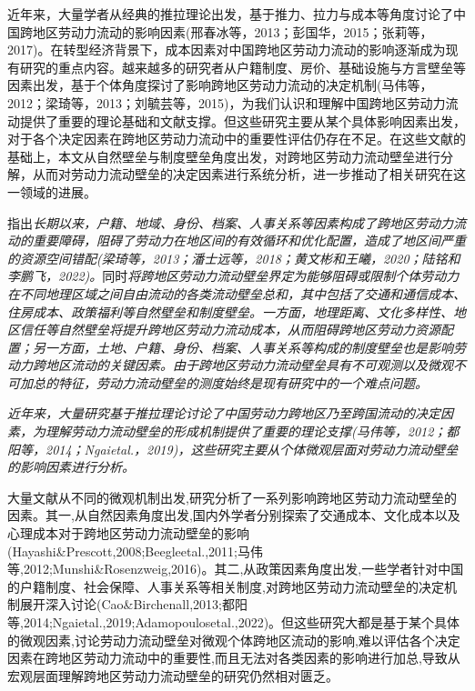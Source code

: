 \documentclass[a4paper,12pt,oneside]{book} %
\begin{document}
近年来，大量学者从经典的推拉理论出发，基于推力、拉力与成本等角度讨论了中国跨地区劳动力流动的影响因素(邢春冰等，2013；彭国华，2015；张莉等，2017)。在转型经济背景下，成本因素对中国跨地区劳动力流动的影响逐渐成为现有研究的重点内容。越来越多的研究者从户籍制度、房价、基础设施与方言壁垒等因素出发，基于个体角度探讨了影响跨地区劳动力流动的决定机制(马伟等，2012；梁琦等，2013；刘毓芸等，2015)，为我们认识和理解中国跨地区劳动力流动提供了重要的理论基础和文献支撑。但这些研究主要从某个具体影响因素出发，对于各个决定因素在跨地区劳动力流动中的重要性评估仍存在不足。在这些文献的基础上，本文从自然壁垒与制度壁垒角度出发，对跨地区劳动力流动壁垒进行分解，从而对劳动力流动壁垒的决定因素进行系统分析，进一步推动了相关研究在这一领域的进展。

\cite{JiangWeiZhongGuoKuaDiQuLaoDongLiLiuDongBiLeiCeDuFangFaYanJinQuShiYuJueDingYinSu2024}指出\textit{长期以来，户籍、地域、身份、档案、人事关系等因素构成了跨地区劳动力流动的重要障碍，阻碍了劳动力在地区间的有效循环和优化配置，造成了地区间严重的资源空间错配(梁琦等，2013；潘士远等，2018；黄文彬和王曦，2020；陆铭和李鹏飞，2022)。}同时\textit{将跨地区劳动力流动壁垒界定为能够阻碍或限制个体劳动力在不同地理区域之间自由流动的各类流动壁垒总和，其中包括了交通和通信成本、住房成本、政策福利等自然壁垒和制度壁垒。一方面，地理距离、文化多样性、地区信任等自然壁垒将提升跨地区劳动力流动成本，从而阻碍跨地区劳动力资源配置；另一方面，土地、户籍、身份、档案、人事关系等构成的制度壁垒也是影响劳动力跨地区流动的关键因素。由于跨地区劳动力流动壁垒具有不可观测以及微观不可加总的特征，劳动力流动壁垒的测度始终是现有研究中的一个难点问题。}

\textit{近年来，大量研究基于推拉理论讨论了中国劳动力跨地区乃至跨国流动的决定因素，为理解劳动力流动壁垒的形成机制提供了重要的理论支撑(马伟等，2012；都阳等，2014；Ngaietal.，2019)，这些研究主要从个体微观层面对劳动力流动壁垒的影响因素进行分析。}

大量文献从不同的微观机制出发,研究分析了一系列影响跨地区劳动力流动壁垒的因素。其一,从自然因素角度出发,国内外学者分别探索了交通成本、文化成本以及心理成本对于跨地区劳动力流动壁垒的影响(Hayashi\&Prescott,2008;Beegleetal.,2011;马伟等,2012;Munshi\&Rosenzweig,2016)。其二,从政策因素角度出发,一些学者针对中国的户籍制度、社会保障、人事关系等相关制度,对跨地区劳动力流动壁垒的决定机制展开深入讨论(Cao\&Birchenall,2013;都阳等,2014;Ngaietal.,2019;Adamopoulosetal.,2022)。但这些研究大都是基于某个具体的微观因素,讨论劳动力流动壁垒对微观个体跨地区流动的影响,难以评估各个决定因素在跨地区劳动力流动中的重要性,而且无法对各类因素的影响进行加总,导致从宏观层面理解跨地区劳动力流动壁垒的研究仍然相对匮乏。
\end{document}
